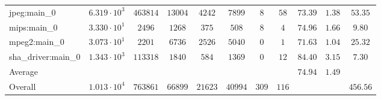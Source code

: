 \begin{tabular}{|l|c|c|c|c|c|c|c|c|c|c|}
jpeg:main\_0            & $ 6.319 \cdot 10^{3} $ & $ 463814 $ & $ 13004 $ & $ 4242  $ & $ 7899  $ & $ 8   $ & $ 58  $ & $ 73.39       $ & $ 1.38    $ & $ 53.35   $ \\
mips:main\_0            & $ 3.330 \cdot 10^{1} $ & $ 2496   $ & $ 1268  $ & $ 375   $ & $ 508   $ & $ 8   $ & $ 4   $ & $ 74.96       $ & $ 1.66    $ & $ 9.80    $ \\
mpeg2:main\_0           & $ 3.073 \cdot 10^{1} $ & $ 2201   $ & $ 6736  $ & $ 2526  $ & $ 5040  $ & $ 0   $ & $ 1   $ & $ 71.63       $ & $ 1.04    $ & $ 25.32   $ \\
sha\_driver:main\_0     & $ 1.343 \cdot 10^{3} $ & $ 113318 $ & $ 1840  $ & $ 584   $ & $ 1369  $ & $ 0   $ & $ 12  $ & $ 84.40       $ & $ 3.15    $ & $ 7.30    $ \\
\hline
Average                 & $                    $ & $        $ & $       $ & $       $ & $       $ & $     $ & $     $ & $ 74.94       $ & $ 1.49    $ & $         $ \\
\hline
Overall                 & $ 1.013 \cdot 10^{4} $ & $ 763861 $ & $ 66899 $ & $ 21623 $ & $ 40994 $ & $ 309 $ & $ 116 $ & $             $ & $         $ & $ 456.56  $ \\
\hline
\end{tabular}
